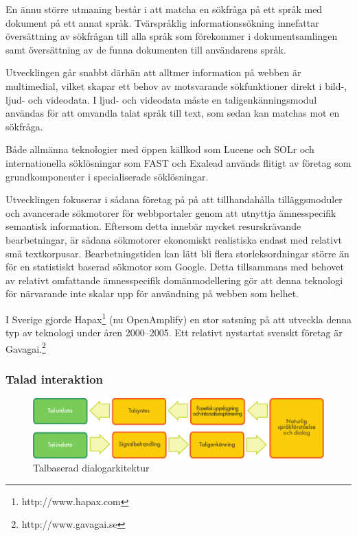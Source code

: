 \begin{multicols}{2}
En ännu större utmaning består i att matcha en sökfråga på ett språk
med dokument på ett annat språk. Tvärspråklig informationssökning
innefattar översättning av sökfrågan till alla språk som förekommer i
dokumentsamlingen samt översättning av de funna dokumenten till
användarens språk.

Utvecklingen går snabbt därhän att alltmer information på webben är
multimedial, vilket skapar ett behov av motsvarande sökfunktioner
direkt i bild-, ljud- och videodata. I ljud- och videodata måste en
taligenkänningsmodul användas för att omvandla talat språk till text,
som sedan kan matchas mot en sökfråga.

Både allmänna teknologier med öppen källkod som Lucene och SOLr och
internationella söklösningar som FAST och Exalead används flitigt av
företag som grundkomponenter i specialiserade sök\-lös\-ning\-ar.

Utvecklingen fokuserar i sådana företag på på att tillhandahålla
tilläggsmoduler och avancerade sökmotorer för webbportaler genom att
utnyttja ämnesspecifik semantisk information. Eftersom detta innebär
mycket resurskrävande bearbetningar, är sådana sökmotorer ekonomiskt
realistiska endast med relativt små textkorpusar. Bearbetningstiden
kan lätt bli flera storleksordningar större än för en statistiskt
baserad sökmotor som Google. Detta tillsammans med behovet av relativt
omfattande ämnesspecifik domänmodellering gör att denna teknologi för
närvarande inte skalar upp för användning på webben som helhet.

I Sverige gjorde Hapax\footnote{http://www.hapax.com} (nu OpenAmplify)
en stor satsning på att utveckla denna typ av teknologi under åren
2000--2005. Ett relativt nystartat svenskt företag är
Gavagai.\footnote{http://www.gavagai.se}


\subsubsection{Talad interaktion}

\begin{figure}[htb]
  \center 
  \includegraphics[width=\textwidth]{../_media/swedish/simple_speech-based_dialogue_architecture}
  \caption{Talbaserad dialogarkitektur}
  \label{fig:dialoguearch_sv}
\end{figure}


\end{multicols}
